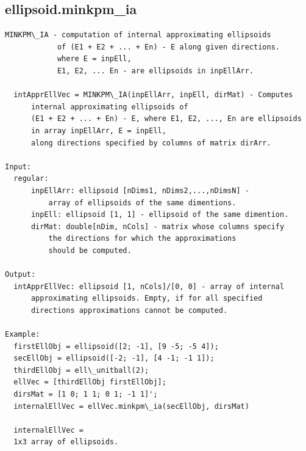 \documentclass[letterpaper,10pt,english]{sphinxmanual}
\begin{document}
\subsection{ellipsoid.minkpm\_ia}
\label{chap_functions:ellipsoid-minkpm-ia}
\begin{Verbatim}[commandchars=\\\{\}]
MINKPM\_IA - computation of internal approximating ellipsoids
            of (E1 + E2 + ... + En) - E along given directions.
            where E = inpEll,
            E1, E2, ... En - are ellipsoids in inpEllArr.

  intApprEllVec = MINKPM\_IA(inpEllArr, inpEll, dirMat) - Computes
      internal approximating ellipsoids of
      (E1 + E2 + ... + En) - E, where E1, E2, ..., En are ellipsoids
      in array inpEllArr, E = inpEll,
      along directions specified by columns of matrix dirArr.

Input:
  regular:
      inpEllArr: ellipsoid [nDims1, nDims2,...,nDimsN] -
          array of ellipsoids of the same dimentions.
      inpEll: ellipsoid [1, 1] - ellipsoid of the same dimention.
      dirMat: double[nDim, nCols] - matrix whose columns specify
          the directions for which the approximations
          should be computed.

Output:
  intApprEllVec: ellipsoid [1, nCols]/[0, 0] - array of internal
      approximating ellipsoids. Empty, if for all specified
      directions approximations cannot be computed.

Example:
  firstEllObj = ellipsoid([2; -1], [9 -5; -5 4]);
  secEllObj = ellipsoid([-2; -1], [4 -1; -1 1]);
  thirdEllObj = ell\_unitball(2);
  ellVec = [thirdEllObj firstEllObj];
  dirsMat = [1 0; 1 1; 0 1; -1 1]';
  internalEllVec = ellVec.minkpm\_ia(secEllObj, dirsMat)

  internalEllVec =
  1x3 array of ellipsoids.
\end{Verbatim}
\end{document}
